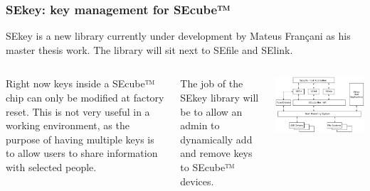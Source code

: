 \documentclass[14pt,usenames,dvipsnames]{beamer}
\begin{document}
\begin{frame}
	\frametitle{SEkey: key management for SEcube™}
		  \fontsize{12pt}{14}\selectfont	

	
	SEkey is a new library currently under development by 	Mateus Françani as his master thesis work. The library will sit next to SEfile and SElink.
	
	\begin{columns}
	    
	    Right now keys inside a SEcube™ chip can only be modified at factory reset. This is not very useful in a working environment, as the purpose of having multiple keys is to allow users to share information with selected people. 
	    
	\vspace{7pt}
	
	The job of the SEkey library will be to allow an admin to dynamically add and remove keys to SEcube™ devices.
	
	      \includegraphics[width=\columnwidth]{sekey.png}
	  
	\end{columns}  

\end{frame}
\end{document}
